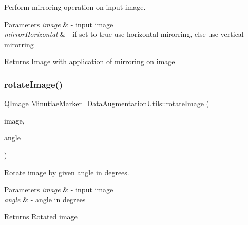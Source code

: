 Perform mirroring operation on input image. 


\begin{DoxyParams}{Parameters}
{\em image} & -\/ input image \\
\hline
{\em mirror\+Horizontal} & -\/ if set to true use horizontal mirorring, else use vertical mirorring \\
\hline
\end{DoxyParams}
\begin{DoxyReturn}{Returns}
Image with application of mirroring on image 
\end{DoxyReturn}
\mbox{\label{class_minutiae_marker___data_augmentation_utils_a965c0c4cb55a60d410a5aee9e9bdcdef}} 
\subsubsection{\texorpdfstring{rotate\+Image()}{rotateImage()}}
{\footnotesize\ttfamily Q\+Image Minutiae\+Marker\+\_\+\+Data\+Augmentation\+Utils\+::rotate\+Image (\begin{DoxyParamCaption}\item[{Q\+Image}]{image,  }\item[{int}]{angle }\end{DoxyParamCaption})\hspace{0.3cm}{\ttfamily [static]}}



Rotate image by given angle in degrees. 


\begin{DoxyParams}{Parameters}
{\em image} & -\/ input image \\
\hline
{\em angle} & -\/ angle in degrees \\
\hline
\end{DoxyParams}
\begin{DoxyReturn}{Returns}
Rotated image 
\end{DoxyReturn}
\mbox{\label{class_minutiae_marker___data_augmentation_utils_a9124f9c3d2dde009af39a65110b37e75}} 
